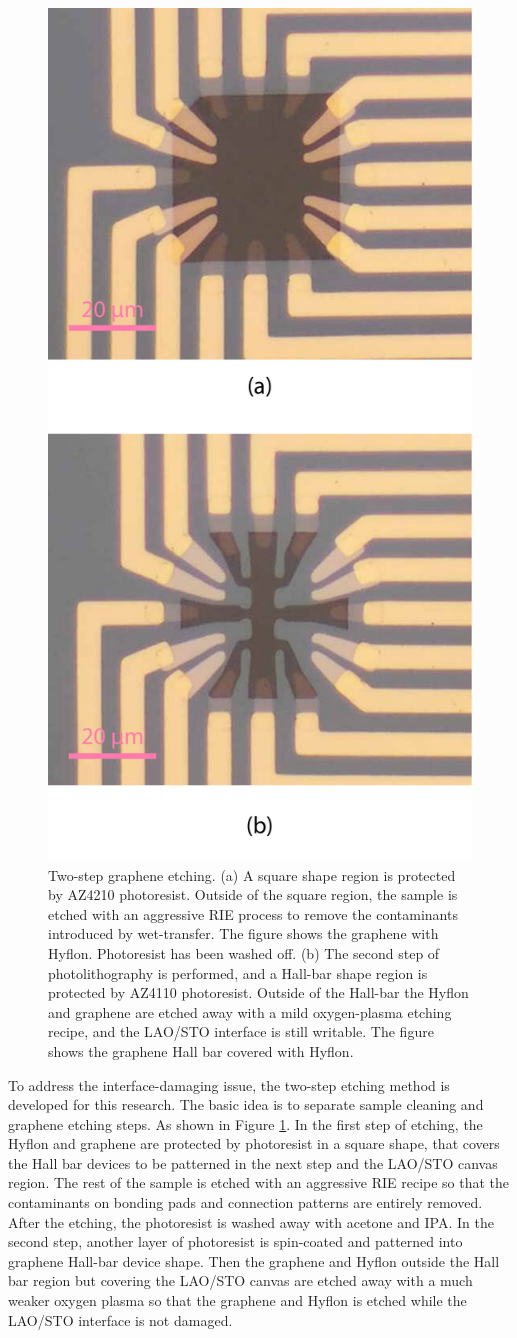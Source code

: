 \documentclass[pdflatex, sectionletters, 12pt]{pittetd}    %
\begin{document}
\begin{figure}[p]
	\centering
	\includegraphics[width=.5\textwidth]{Drawing/RIETwoStep.pdf}
	\caption{Two-step graphene etching. (a) A square shape region is protected by AZ4210 photoresist. Outside of the square region, the sample is etched with an aggressive RIE process to remove the contaminants introduced by wet-transfer. The figure shows the graphene with Hyflon. Photoresist has been washed off. (b) The second step of photolithography is performed, and a Hall-bar shape region is protected by AZ4110 photoresist. Outside of the Hall-bar the Hyflon and graphene are etched away with a mild oxygen-plasma etching recipe, and the LAO/STO interface is still writable. The figure shows the graphene Hall bar covered with Hyflon. }
	\label{FIG:RIETwoStep}
\end{figure}

To address the interface-damaging issue, the two-step etching method is developed for this research. The basic idea is to separate sample cleaning and graphene etching steps. As shown in Figure \ref{FIG:RIETwoStep}. In the first step of etching, the Hyflon and graphene are protected by photoresist in a square shape, that covers the Hall bar devices to be patterned in the next step and the LAO/STO canvas region. The rest of the sample is etched with an aggressive RIE recipe so that the contaminants on bonding pads and connection patterns are entirely removed. After the etching, the photoresist is washed away with acetone and IPA. In the second step, another layer of photoresist is spin-coated and patterned into graphene Hall-bar device shape. Then the graphene and Hyflon outside the Hall bar region but covering the LAO/STO canvas are etched away with a much weaker oxygen plasma so that the graphene and Hyflon is etched while the LAO/STO interface is not damaged.
\end{document}
